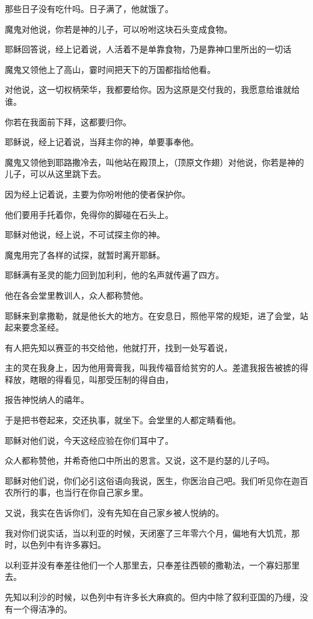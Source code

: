 \documentclass[12pt,oneside]{book}
\begin{document}
那些日子没有吃什吗。日子满了，他就饿了。

魔鬼对他说，你若是神的儿子，可以吩咐这块石头变成食物。

耶稣回答说，经上记着说，人活着不是单靠食物，乃是靠神口里所出的一切话

魔鬼又领他上了高山，霎时间把天下的万国都指给他看。

对他说，这一切权柄荣华，我都要给你。因为这原是交付我的，我愿意给谁就给谁。

你若在我面前下拜，这都要归你。

耶稣说，经上记着说，当拜主你的神，单要事奉他。

魔鬼又领他到耶路撒冷去，叫他站在殿顶上，（顶原文作翅）对他说，你若是神的儿子，可以从这里跳下去。

因为经上记着说，主要为你吩咐他的使者保护你。

他们要用手托着你，免得你的脚碰在石头上。

耶稣对他说，经上说，不可试探主你的神。

魔鬼用完了各样的试探，就暂时离开耶稣。

耶稣满有圣灵的能力回到加利利，他的名声就传遍了四方。

他在各会堂里教训人，众人都称赞他。

耶稣来到拿撒勒，就是他长大的地方。在安息日，照他平常的规矩，进了会堂，站起来要念圣经。

有人把先知以赛亚的书交给他，他就打开，找到一处写着说，

主的灵在我身上，因为他用膏膏我，叫我传福音给贫穷的人。差遣我报告被掳的得释放，瞎眼的得看见，叫那受压制的得自由，

报告神悦纳人的禧年。

于是把书卷起来，交还执事，就坐下。会堂里的人都定睛看他。

耶稣对他们说，今天这经应验在你们耳中了。

众人都称赞他，并希奇他口中所出的恩言。又说，这不是约瑟的儿子吗。

耶稣对他们说，你们必引这俗语向我说，医生，你医治自己吧。我们听见你在迦百农所行的事，也当行在你自己家乡里。

又说，我实在告诉你们，没有先知在自己家乡被人悦纳的。

我对你们说实话，当以利亚的时候，天闭塞了三年零六个月，偏地有大饥荒，那时，以色列中有许多寡妇。

以利亚并没有奉差往他们一个人那里去，只奉差往西顿的撒勒法，一个寡妇那里去。

先知以利沙的时候，以色列中有许多长大麻疯的。但内中除了叙利亚国的乃缦，没有一个得洁净的。
\end{document}
